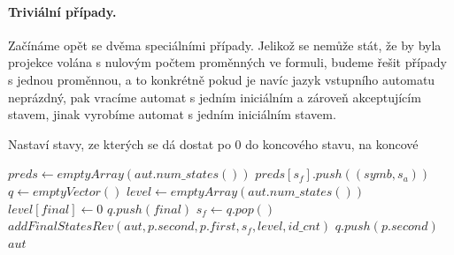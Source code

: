 \paragraph{Triviální případy.} Začínáme opět se dvěma speciálními případy. Jelikož se nemůže stát, že by byla projekce volána s nulovým počtem proměnných ve formuli, budeme řešit případy s jednou proměnnou, a to konkrétně pokud je navíc jazyk vstupního automatu neprázdný, pak vracíme automat s jedním iniciálním a zároveň akceptujícím stavem, jinak vyrobíme automat s jedním iniciálním stavem. 

\begin{algorithm}
    \caption{Nastaví stavy, ze kterých se dá dostat po $0$ do koncového stavu, na koncové}
    \label{removeUselessZeros}
        \begin{algorithmic}[1]
                \State $preds \gets emptyArray(aut.num\_states())$
                        \State $preds[s_f].push((symb,s_a))$
                    \EndFor
                \EndFor
                \State $q \gets emptyVector()$
                \State $level \gets emptyArray(aut.num\_states())$
                    \State $level[final] \gets 0$
                    \State $q.push(final)$
                \EndFor
                    \State $s_f \gets q.pop()$
                        \State $addFinalStatesRev(aut,p.second,p.first,s_f,level,id\_cnt)$
                            \State $q.push(p.second)$
                        \EndIf
                    \EndFor
                \EndWhile
                \State \Return $aut$
            \EndProcedure
        \end{algorithmic}
\end{algorithm}


